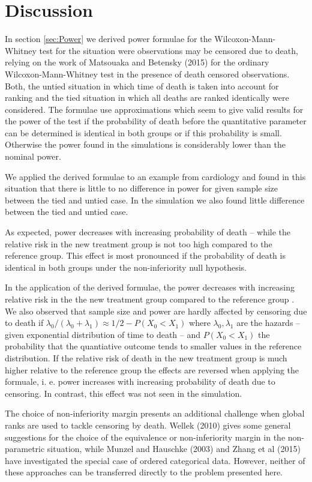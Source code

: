 \documentclass[bimj,fleqn]{w-art}\usepackage[]{graphicx}\usepackage[]{color}
\theoremstyle{plain}
\theoremstyle{definition}
\begin{document}
\section{Discussion}
\label{sec:Discussion}
In section \ref{sec:Power} we derived power formulae for the Wilcoxon-Mann-Whitney
test for the situation were observations may be censored due to death, relying
on the work of Matsouaka and Betensky (2015) for the ordinary Wilcoxon-Mann-Whitney
test in the presence of death censored observations. Both, the untied situation
in which time of death is taken into account for ranking and the tied situation
in which all deaths are ranked identically were considered. The formulae use
approximations which seem to give valid results for the power of the test if the
probability of death before the quantitative parameter can be determined is
identical in both groups or if this probability is small. Otherwise the power
found in the simulations is considerably lower than the nominal power.

We applied the derived formulae to an example from cardiology and found in this
situation that there is little to no difference in power for given sample size
between the tied and untied case. In the simulation we also found little
difference between the tied and untied case.

As expected, power decreases with increasing probability of death -- while the
relative risk in the new treatment group is not too high compared to the reference
group. This effect is most pronounced if the probability of death is identical in
both groups under the non-inferiority null hypothesis.

In the application of the derived formulae, the power decreases with increasing
relative risk in the the new treatment group compared to the reference group . We
also observed that sample size and power are hardly affected by censoring due to
death if $\lambda_0/(\lambda_0 + \lambda_1) \approx 1/2 - P(X_0 < X_1)$ where
$\lambda_0, \lambda_1$ are the hazards -- given exponential distribution of time
to death -- and $P(X_0 < X_1)$ the probability that the quantiative outcome tends
to smaller values in the reference distribution. If the relative risk of death
in the new treatment group is much higher relative to the reference group the
effects are reversed when applying the formuale, i. e. power increases with
increasing probability of death due to censoring. In contrast, this effect was
not seen in the simulation.

The choice of non-inferiority margin presents an additional challenge when global
ranks are used to tackle censoring by death. Wellek (2010) gives some general
suggestions for the choice of the equivalence or non-inferiority margin in the
non-parametric situation, while Munzel and Hauschke (2003) and Zhang et al (2015)
have investigated the special case of ordered categorical data. However, neither
of these approaches can be transferred directly to the problem presented here.
\end{document}

